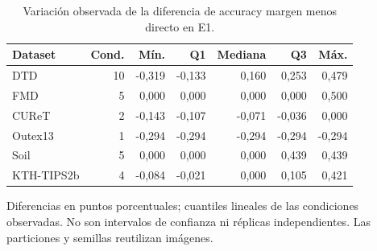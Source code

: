 \begin{table}[!htbp]\centering
\fontsize{8}{10}\selectfont\setlength{\tabcolsep}{4pt}
\caption{Variación observada de la diferencia de accuracy margen menos directo en E1.}\label{tab:ars-e1-variation}
\begin{tabular}{@{}lrrrrrr@{}}\toprule
Dataset & Cond. & Mín. & Q1 & Mediana & Q3 & Máx.\\\midrule
DTD & 10 & -0,319 & -0,133 & 0,160 & 0,253 & 0,479\\
FMD & 5 & 0,000 & 0,000 & 0,000 & 0,000 & 0,500\\
CUReT & 2 & -0,143 & -0,107 & -0,071 & -0,036 & 0,000\\
Outex13 & 1 & -0,294 & -0,294 & -0,294 & -0,294 & -0,294\\
Soil & 5 & 0,000 & 0,000 & 0,000 & 0,439 & 0,439\\
KTH-TIPS2b & 4 & -0,084 & -0,021 & 0,000 & 0,105 & 0,421\\
\bottomrule\end{tabular}
\par\smallskip\begin{minipage}{0.98\textwidth}\footnotesize Diferencias en puntos porcentuales; cuantiles lineales de las condiciones observadas. No son intervalos de confianza ni réplicas independientes. Las particiones y semillas reutilizan imágenes.\end{minipage}
\end{table}
